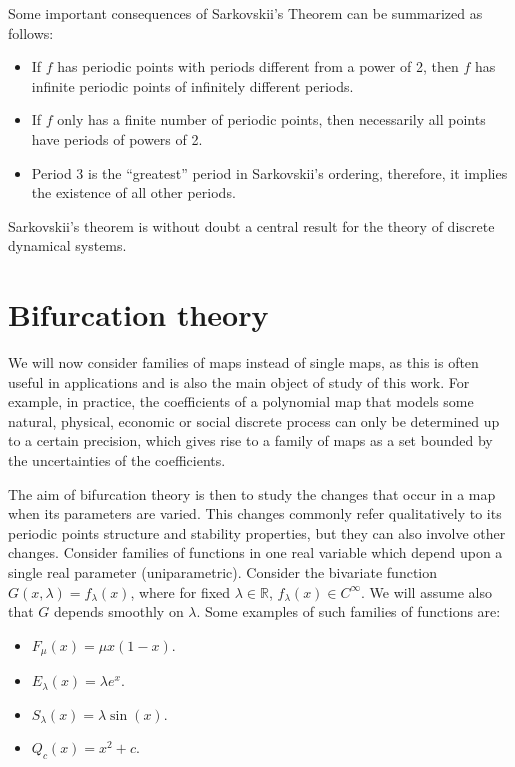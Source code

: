 \documentclass[10pt,twoside,titlepage]{book}
\numberwithin{equation}{chapter}
\numberwithin{figure}{chapter}
\numberwithin{table}{chapter}
\theoremstyle{plain}%
\theoremstyle{definition}
\theoremstyle{remark}
\begin{document}
Some important consequences of Sarkovskii's Theorem can be summarized as follows:
\begin{itemize}
	\item If $f$ has periodic points with periods different from a power of 2, then $f$ has infinite periodic points of infinitely different periods.
	\item If $f$ only has a finite number of periodic points, then necessarily all points have periods of powers of 2.
	\item Period 3 is the ``greatest'' period in Sarkovskii's ordering, therefore, it implies the existence of all other periods.
\end{itemize}

Sarkovskii's theorem is without doubt a central result for the theory of discrete dynamical systems.

\section{Bifurcation theory}

We will now consider families of maps instead of single maps, as this is often useful in applications and is also the main object of study of this work. For example, in practice, the coefficients of a polynomial map that models some natural, physical, economic or social discrete process can only be determined up to a certain precision, which gives rise to a family of maps as a set bounded by the uncertainties of the coefficients.

The aim of bifurcation theory is then to study the changes that occur in a map when its parameters are varied. This changes commonly refer qualitatively to its periodic points structure and stability properties, but they can also involve other changes. Consider families of functions in one real variable which depend upon a single real parameter (uniparametric). Consider the bivariate function $G(x,\lambda)=f_{\lambda}(x)$, where for fixed $\lambda\in\mathbb{R}$, $f_{\lambda}(x)\in C^{\infty}$. We will assume also that $G$ depends smoothly on $\lambda$. Some examples of such families of functions are:

\begin{itemize}
	\item $F_{\mu}(x)=\mu x(1-x)$.
	\item $E_{\lambda}(x)=\lambda e^{x}$.
	\item $S_{\lambda}(x)=\lambda\sin(x)$.
	\item $Q_{c}(x)=x^{2}+c$.
\end{itemize}
\end{document}
